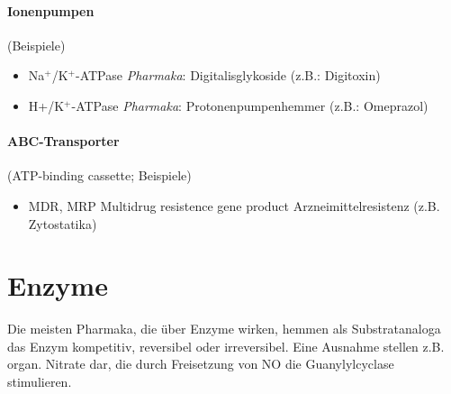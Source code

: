 \documentclass[10pt,a4paper]{report}
\begin{document}
\paragraph{Ionenpumpen} 
(Beispiele)

\begin{itemize}
	\item Na$^+$/K$^+$-ATPase 	\textit{Pharmaka}: Digitalisglykoside (z.B.: Digitoxin)
	\item H+/K$^+$-ATPase		\textit{Pharmaka}: Protonenpumpenhemmer (z.B.: Omeprazol)
\end{itemize}

\paragraph{ABC-Transporter} 
(ATP-binding cassette; Beispiele)

\begin{itemize}
	\item MDR, MRP		Multidrug resistence gene product Arzneimittelresistenz (z.B. Zytostatika)	
\end{itemize}

\section{Enzyme}
Die meisten Pharmaka, die über Enzyme wirken, hemmen als Substratanaloga das Enzym kompetitiv, reversibel oder irreversibel. Eine Ausnahme stellen z.B. organ. Nitrate dar, die durch Freisetzung von NO die Guanylylcyclase stimulieren.\\
\end{document}
